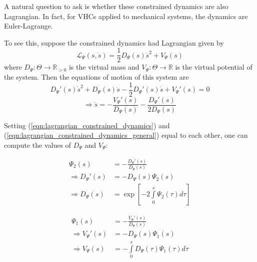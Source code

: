 A natural question to ask is whether these constrained dynamics are also
Lagrangian. In fact, for VHCs applied to mechanical systems, the dynamics are
Euler-Lagrange. \cite{lagrangian_structure_reduced_dynamics_vhcs}

To see this, suppose the constrained dynamics had Lagrangian given by
\begin{equation}\label{eqn:vhcs_constrained_lagrangian}
   \mathcal{L}_{\Psi}(s,\dot{s}) = \frac{1}{2}
   D_{\Psi}(s)\dot{s}^2 + V_{\Psi}(s)
\end{equation}
where \(D_{\Psi} : \Theta \rightarrow \mathbb{R}_{>0}\) is the virtual mass
and \(V_{\Psi} : \Theta \rightarrow \mathbb{R}\) is the virtual potential of the
system. Then the equations of motion of this system are
\begin{equation*}
   D_{\Psi}'(s)\dot{s}^2 + D_{\Psi}(s)\ddot{s} - \frac{1}{2}D_{\Psi}'(s)\dot{s}
   + V_{\Psi}'(s) = 0
\end{equation*}
\begin{equation}\label{eqn:lagrangian_constrained_dynamics_general}
   \Rightarrow \ddot{s} = -\frac{V_{\Psi}'(s)}{D_{\Psi}(s)} -
   \frac{D_{\Psi}'(s)}{2 D_{\Psi}(s)}
\end{equation}

Setting (\ref{eqn:lagrangian_constrained_dynamics}) and
(\ref{eqn:lagrangian_constrained_dynamics_general}) equal to each other, one
can compute the values of \(D_{\Psi}\) and \(V_{\Psi}\): 

\begin{minipage}{0.48\textwidth}
\begin{align*}
   \Psi_2(s) &= -\frac{D_{\Psi}'(s)}{D_\Psi(s)} \\
   \Rightarrow D_{\Psi}'(s) &= -D_{\Psi}(s) \Psi_2(s) \\
   \Rightarrow D_{\Psi}(s) &= \exp\left[ 
   -2\int \limits_{0}^s \Psi_2(\tau) d\tau \right]
\end{align*}
\end{minipage}
\begin{minipage}{0.48\textwidth}
\begin{align*}
   \Psi_1(s) &= -\frac{V_{\Psi}'(s)}{D_{\Psi}(s)} \\
   \Rightarrow V_{\Psi}'(s) &= -D_{\Psi}(s) \Psi_1(s) \\
   \Rightarrow V_{\Psi}(s) &= - \int \limits_{0}^s
   D_{\Psi}(\tau)\Psi_1(\tau)d\tau
\end{align*}
\end{minipage}

